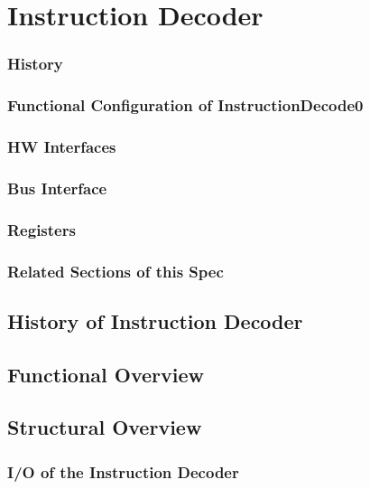 \section{Instruction Decoder}
\label{sec:decfunc01}
\subsubsection{History}


\subsubsection{Functional Configuration of InstructionDecode0}


\subsubsection{HW Interfaces}


\subsubsection{Bus Interface}

\subsubsection{Registers}

\subsubsection{Related Sections of this Spec}

\subsection{History of Instruction Decoder}

\subsection{Functional Overview}
\label{subsec:decfunc01}

\subsection{Structural Overview}
\subsubsection{I/O of the Instruction Decoder}

